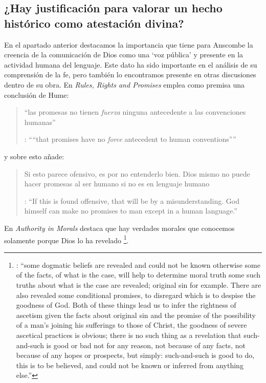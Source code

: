 \subsection{¿Hay justificación para valorar un hecho histórico como atestación divina?}

En el apartado anterior destacamos la importancia que tiene para Anscombe la creencia de la comunicación de Dios como una `voz pública' y presente en la actividad humana del lenguaje. Este dato ha sido importante en el análisis de su comprensión de la fe, pero también lo encontramos presente en otras discusiones dentro de su obra. En \emph{Rules, Rights and Promises} emplea como premisa una conclusión de Hume: \blockquote[{\cite[99]{anscombe1981erp:rrp}}: \enquote{``that promises have no \emph{force} antecedent to human conventions''}]{``las promesas no tienen \emph{fuerza} ninguna antecedente a las convenciones humanas''} y sobre esto añade: \blockquote[{\cite[99]{anscombe1981erp:rrp}}: \enquote{If this is found offensive, that will be by a misunderstanding. God himself can make no promises to man except in a human language.}]{Si esto parece ofensivo, es por no entenderlo bien. Dios mismo no puede hacer promesas al ser humano si no es en lenguaje humano}. En \emph{Authority in Morals} destaca que hay verdades morales que conocemos solamente porque Dios lo ha revelado
\footnote{\cite[48-49]{anscombe1981erp:am}: \enquote{some dogmatic beliefs are revealed and could not be known otherwise \textelp{} some of the facts, of what is the case, will help to determine moral truth \textelp{} some such truths about what is the case are revealed; original sin for example. There are also revealed some conditional promises, to disregard which is to despise the goodness of God. Both of these things lead us to infer the rightness of ascetism \textelp{} given the facts about original sin and the promise of the possibility of a man's joining his sufferings to those of Christ, the goodness of severe ascetical practices \textelp{} is obvious; there is no such thing as a revelation that such-and-such is good or bad not for any reason, not because of any facts, not because of any hopes or prospects, but simply: such-and-such is good to do, this is to be believed, and could not be known or inferred from anything else.}}.
